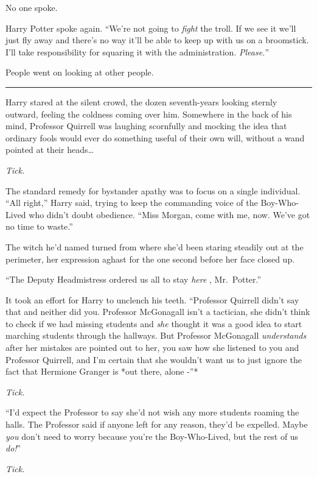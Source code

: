 No one spoke.

Harry Potter spoke again. ``We're not going to \emph{fight} the troll.
If we see it we'll just fly away and there's no way it'll be able to
keep up with us on a broomstick. I'll take responsibility for squaring
it with the administration. \emph{Please.}''

People went on looking at other people.

\begin{center}\rule{3in}{0.4pt}\end{center}

Harry stared at the silent crowd, the dozen seventh-years looking
sternly outward, feeling the coldness coming over him. Somewhere in the
back of his mind, Professor Quirrell was laughing scornfully and mocking
the idea that ordinary fools would ever do something useful of their own
will, without a wand pointed at their heads\ldots{}

\emph{Tick.}

The standard remedy for bystander apathy was to focus on a single
individual. ``All right,'' Harry said, trying to keep the commanding
voice of the Boy-Who-Lived who didn't doubt obedience. ``Miss Morgan,
come with me, now. We've got no time to waste.''

The witch he'd named turned from where she'd been staring steadily out
at the perimeter, her expression aghast for the one second before her
face closed up.

``The Deputy Headmistress ordered us all to stay \emph{here} ,
Mr.~Potter.''

It took an effort for Harry to unclench his teeth. ``Professor Quirrell
didn't say that and neither did you. Professor McGonagall isn't a
tactician, she didn't think to check if we had missing students and
\emph{she} thought it was a good idea to start marching students through
the hallways. But Professor McGonagall \emph{understands} after her
mistakes are pointed out to her, you saw how she listened to you and
Professor Quirrell, and I'm certain that she wouldn't want us to just
ignore the fact that Hermione Granger is *out there, alone -''*

\emph{Tick.}

``I'd expect the Professor to say she'd not wish any more students
roaming the halls. The Professor said if anyone left for any reason,
they'd be expelled. Maybe \emph{you} don't need to worry because you're
the Boy-Who-Lived, but the rest of us \emph{do!}''

\emph{Tick.}

